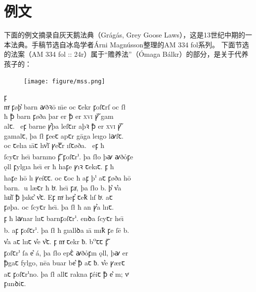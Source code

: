 \section{例文}
下面的例文摘录自灰天鹅法典（Grágás, Grey Goose Laws），这是13世纪中期的一本法典。手稿节选自冰岛学者Árni Magnússon整理的AM 334 fol系列\footnotemark。
下面节选的法案（AM 334 fol :: 24r）属于“赡养法”（Ómaga Bálkr\footnotemark）的部分，是关于代养孩子的：
\begin{multicols}{2}
    \begin{figure}[H]
        \texttt{[image: figure/mss.png]}
    \end{figure}
    \newcolumn
    \quad
    \fontsize{14pt}{14pt}\selectfont
    {\medieval
    \hfill \Eclosedunical ꝼ \\
    \noindent mͬ ꝼøþ͛ barn {\andron ꜹ}ðꝛ\=o \=me oc ꞇekr  ꝼoſꞇrſ oc ſ\l\\
    ħ ꝥ barn ꝼøða þar  er ꝥ er \textsc{xvi} ꝩᷓ gam\\
    alꞇ. \Eunical \nwithdescender \ eꝼ barne ꝩ͛þa leſꞇır aþꝛ ꝥ er \textsc{xvi} ꝩᷓ\\
    gamalꞇ, þa ſ{\l} ꝼeeꞇ apꞇr g\=aga leıgo l{\andron ꜹ}ſꞇ.\\
    oc ꞇelıa ı\=aꞇ  hv͛ſ ꝩeꞇᷓr ı\nwithdescender ſꞇøða\nwithdescender . \Eclosedunical \nwithdescender \ eꝼ ħ\\
    ſcyꞇr he\=ı barnıno ꝼᷓ ꝼoſꞇr\textsuperscript{ı}. þa {ſ\l}o þ{\andron ꜹ} {\andron ꜹ}ðỏꝼe\\
    \k{o}ll ꝼylgıa he\=ı er ħ haꝼ\dh e ꝩı\dh ꝛ ꞇekıꞇ. \Eunical ꝼ ħ \\
    haꝼ\dh e h\=o lı{\dh} ꝩe\'{i}ꞇꞇ. oc ꞇoc ħ aꝼ þ\textsuperscript{ı} aꞇ ꝼøða h\=o \\
    barn. {\LARGE }u l\ae ꞇr ħ bͬ. he\=ı ꝼaͬ, þa {ſ\l}o b. þ͛ v͛\th a\\
    hu͛ſ ꝥ
    þıkc͛ v͛ꞇ. Eꝼ mͬ heꝼ͛ ꞇeꝁ  lı\dh ſ bͬ. aꞇ \\
    ꝼøþa. oc ſcyꞇr he\=ı. þa {ſ\l} ħ an ꝩ͛a lı\dh ıꞇ.\\
    \Eclosedunical ꝼ ħ l{\andron ꜹ}nar lı\dh ıꞇ barnꝼoſꞇr\textsuperscript{ı}. enꝺa ſcyꞇr he\=ı \\
    b. aꝼ ꝼoſꞇr\textsuperscript{ı}. þa {ſ\l} ħ gıallꝺa ı\=a mıꝁ ꝼe ſ\=e b.\\
    v͛\dh a aꞇ lı\dh ıꞇ v͛e v͛ꞇ. \Eclosedunical ꝼ mͬ ꞇekr ƀ. b\textsuperscript{o}ꞇꞇ ꝼᷓ \\
    ꝼoſꞇr\textsuperscript{ı} ſa e͛ \'{a}, þa {ſ\l}o epꞇ͛ {\andron ꜹ}ðỏꝼın \k{o}ll, þ{\andron ꜹ} er \\
    ꝥgaꞇ fylg\dh o, n\=ea buar be͛ ꝥ aꞇ ƀ. v͛e  ꝩ\ae rꞇ\\
    aꞇ ꝼoſꞇr\textsuperscript{ı}no. þa {ſ\l} allꞇ rakna ꝼ\'{e}iꞇ ꝥ e͛ m; vͬ\\
    ꝼunꝺiꞇ.
    }
\end{multicols}
